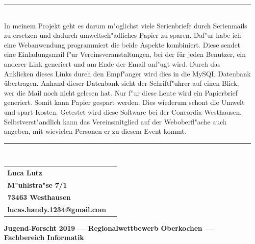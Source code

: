 \documentclass[12pt,twoside]{article}  %
\begin{document}
  \begin{center}
	     \vspace{2.385pt}\nointerlineskip\rule{\textwidth}{0.4pt}\\
	  In meinem Projekt 
          geht es darum m"oglichst viele Serienbriefe durch Serienmails zu ersetzen und dadurch umweltsch"adliches Papier zu sparen. 
          Daf"ur habe ich eine Webanwendung programmiert die beide Aspekte kombiniert. Diese sendet eine Einladungsmail f"ur Vereinsveranstaltungen, bei der
	  für jeden Benutzer, ein anderer Link generiert und am Ende der Email anf"ugt wird. Durch das Anklicken dieses Links durch den Empf"anger 
          wird dies in die MySQL Datenbank übertragen. Anhand dieser Datenbank sieht der Schriftf"uhrer auf einen Blick, wer die Mail noch nicht gelesen 
	  hat. Nur f"ur diese Leute wird ein Papierbrief generiert. Somit kann Papier gespart werden. Dies wiederum schont die Umwelt und spart 
	  Kosten. Getestet wird diese Software bei der 
	  \glqq Concordia Westhausen\grqq. Selbstverst"andlich kann das Vereinsmitglied auf der Weboberfl"ache auch angeben, mit wievielen Personen er zu diesem Event kommt.\\
	     \vspace{2.385pt}\nointerlineskip\rule{\textwidth}{0.4pt}\\
  \end{center} 


  \vfill
  \begin{center}
  \begin{tabular}{C{0.5\textwidth}C{0.5\textwidth}}
    \textbf{Luca Lutz} \\
    \textbf{M"uhlstra"se 7/1} \\
    \textbf{73463 Westhausen} \\
    \textbf{lucas.handy.1234@gmail.com} \\
  \end{tabular}
  \end{center}
  \vfill

  \hrulefill

  \parbox{\textwidth}{\centering \bf Jugend-Forscht 2019 ---
    Regionalwettbewerb Oberkochen --- \\
    Fachbereich Informatik}
  \thispagestyle{empty}
  \newpage

  \tableofcontents
  \listoffigures
  \listoftables
  \setlength{\parskip}{1ex}
  \cleardoublepage

\end{document}
